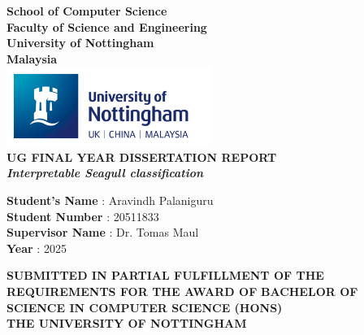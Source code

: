 \documentclass[a4paper,12pt]{article}
\begin{document}
\begin{titlepage}
    \begin{center}

        \textbf{\LARGE{School of Computer Science}}\\[0.5em]
        \textbf{\Large{Faculty of Science and Engineering}}\\[0.5em]
        \textbf{\Large{University of Nottingham}}\\[0.5em]
        \textbf{\Large{Malaysia}}\\[5em]

        \includegraphics[width=0.5\textwidth]{images/nottingham_logo.png}\\[3em]

        \textbf{\Large{UG FINAL YEAR DISSERTATION REPORT}}\\[6em]
        \textbf{\large{\textit{Interpretable Seagull classification}}}\\[6em]

    \end{center}

    \begin{center}
        \begin{minipage}{0.6\textwidth}  %
            \raggedright
            \textbf{Student's Name} \hspace{1.5cm}: Aravindh Palaniguru\\[1em]
            \textbf{Student Number} \hspace{1.4cm}: 20511833\\[1em]
            \textbf{Supervisor Name} \hspace{1.2cm}: Dr. Tomas Maul\\[1em]
            \textbf{Year} \hspace{3.8cm}: 2025\\[4em]
        \end{minipage}
    \end{center}

    \vfill

    \begin{center}
        \begin{minipage}{\textwidth}
            \centering
            {\fontsize{12}{10}\selectfont\textbf{SUBMITTED IN PARTIAL FULFILLMENT OF THE REQUIREMENTS FOR THE AWARD OF}}
            {\fontsize{12}{10}\selectfont\textbf{BACHELOR OF SCIENCE IN COMPUTER SCIENCE (HONS)}}\\
            {\fontsize{12}{10}\selectfont\textbf{THE UNIVERSITY OF NOTTINGHAM}}
        \end{minipage}
    \end{center}
\end{titlepage}
\end{document}
